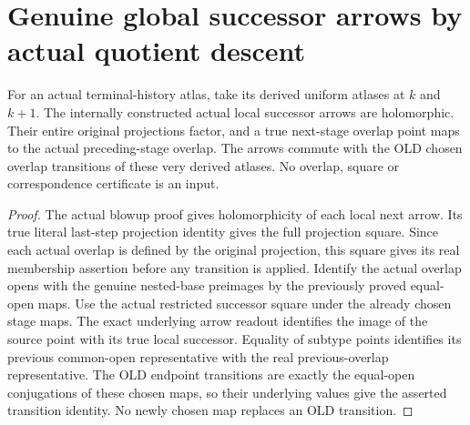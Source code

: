 \section{Genuine global successor arrows by actual quotient descent}

\begin{theorem}
\label{hir:sharp-actual-curve-local-successor-transition}
\leanok
For an actual terminal-history atlas, take its derived uniform atlases at
$k$ and $k+1$. The internally constructed actual local successor arrows are
holomorphic. Their entire original projections factor, and a true next-stage
overlap point maps to the actual preceding-stage overlap. The arrows commute
with the OLD chosen overlap transitions of these very derived atlases.
No overlap, square or correspondence certificate is an input.
\end{theorem}
\begin{proof}
The actual blowup proof gives holomorphicity of each local next arrow.
Its true literal last-step projection identity gives the full projection
square. Since each actual overlap is defined by the original projection,
this square gives its real membership assertion before any transition is
applied. Identify the actual overlap opens with the genuine nested-base
preimages by the previously proved equal-open maps. Use the actual restricted
successor square under the already chosen stage maps. The exact underlying
arrow readout identifies the image of the source point with its true local
successor. Equality of subtype points identifies its previous common-open
representative with the real previous-overlap representative. The OLD
endpoint transitions are exactly the equal-open conjugations of these
chosen maps, so their underlying values give the asserted transition
identity. No newly chosen map replaces an OLD transition.
\end{proof}

